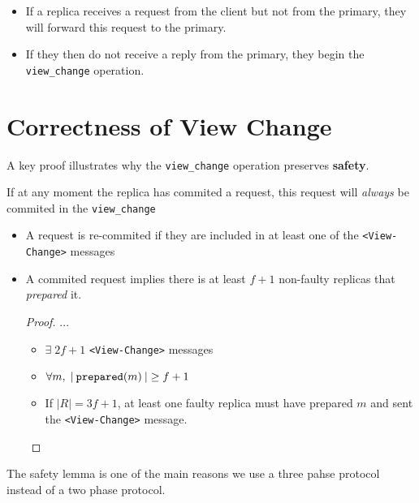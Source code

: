 \documentclass{easyclass}
\begin{document}
\begin{theo}{}
    \begin{itemize}
        \item If a replica receives a request from the client but not from the primary,
        they will forward this request to the primary.
        \item If they then do not receive a reply from the primary, they begin
        the \texttt{view\_change} operation.
    \end{itemize}
\end{theo}

\section{Correctness of View Change}
A key proof illustrates why the \texttt{view\_change} operation 
preserves \textbf{safety}.

\begin{theo}{}
    \begin{definition}
        If at any moment the replica has commited a request, this request
        will \emph{always} be commited in the \texttt{view\_change}
    \end{definition}
    \begin{itemize}
        \item A request is re-commited if they are included in at least 
        one of the \texttt{<View-Change>} messages
        \item A commited request implies there is at least $f+1$ non-faulty replicas
        that \emph{prepared} it.
        \begin{proof}
            ...
            \begin{itemize}
                \item $\exists \; 2f+1$ \texttt{<View-Change>} messages
                \item $\forall m, \; \vert \: \text{\texttt{prepared}}(m) \: \vert \geq f+1$
                \item If $\vert R \vert = 3f + 1$, at least one faulty replica must have prepared
                $m$ and sent the \texttt{<View-Change>} message.
            \end{itemize}
        \end{proof}
    \end{itemize}
\end{theo}

The safety lemma is one of the main reasons we use a three pahse protocol
instead of a two phase protocol.
\end{document}
